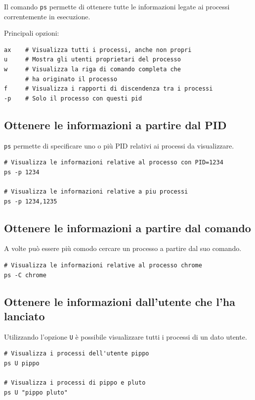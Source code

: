 \documentclass[a4paper]{report}
\newenvironment{code}{\begin{tcolorbox}[size=small]}{\end{tcolorbox}}
\begin{document}
Il comando \texttt{ps} permette di ottenere tutte le informazioni legate ai processi correntemente in esecuzione. 

Principali opzioni:

\begin{code}
\begin{lstlisting}
ax    # Visualizza tutti i processi, anche non propri
u     # Mostra gli utenti proprietari del processo
w     # Visualizza la riga di comando completa che
      # ha originato il processo
f     # Visualizza i rapporti di discendenza tra i processi
-p    # Solo il processo con questi pid
\end{lstlisting}
\end{code}

\subsection{Ottenere le informazioni a partire dal PID}

\texttt{ps} permette di specificare uno o più PID relativi ai processi da visualizzare.
\begin{code}
\begin{lstlisting}
# Visualizza le informazioni relative al processo con PID=1234
ps -p 1234

# Visualizza le informazioni relative a piu processi
ps -p 1234,1235
\end{lstlisting}
\end{code}

\subsection{Ottenere le informazioni a partire dal comando}

A volte può essere più comodo cercare un processo a partire dal suo comando.
\begin{code}
\begin{lstlisting}
# Visualizza le informazioni relative al processo chrome
ps -C chrome
\end{lstlisting}
\end{code}

\subsection{Ottenere le informazioni dall'utente che l'ha lanciato}

Utilizzando l'opzione \texttt{U} è possibile visualizzare tutti i processi di un dato utente.
\begin{code}
	\begin{lstlisting}
# Visualizza i processi dell'utente pippo
ps U pippo

# Visualizza i processi di pippo e pluto
ps U "pippo pluto"
	\end{lstlisting}
\end{code}
\end{document}
